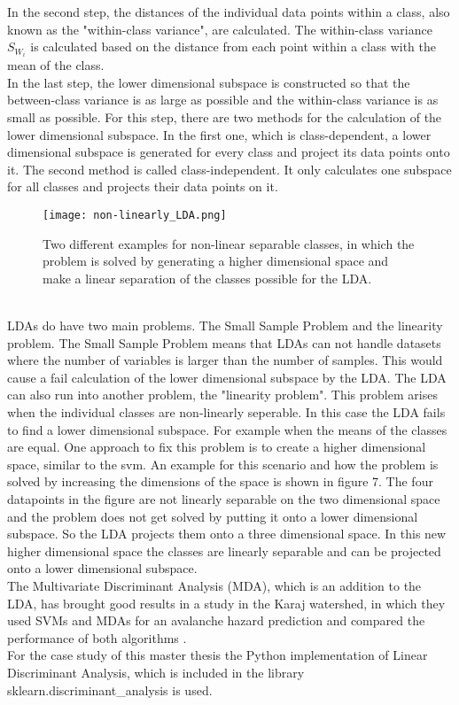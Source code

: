 \documentclass[../masterarbeit.tex]{subfiles}
\begin{document}
In the second step, the distances of the individual data points within a class, also known as the "within-class variance", are calculated. The within-class variance \(S_{W_i}\) is calculated based on the distance from each point within a class with the mean of the class. \autocite[]{Tharwat:2017} \\
In the last step, the lower dimensional subspace is constructed so that the between-class variance is as large as possible and the within-class variance is as small as possible. For this step, there are two methods for the calculation of the lower dimensional subspace. In the first one, which is class-dependent, a lower dimensional subspace is generated for every class and project its data points onto it. The second method is called class-independent. It only calculates one subspace for all classes and projects their data points on it. \autocite[]{Tharwat:2017}
\begin{figure}[h]
    \centering
    \texttt{[image: non-linearly\_LDA.png]}
    \caption{Two different examples for non-linear separable classes, in which the problem is solved by generating a higher dimensional space and make a linear separation of the classes possible for the LDA.}
\end{figure} \\
LDAs do have two main problems. The Small Sample Problem and the linearity problem.
The Small Sample Problem means that LDAs can not handle datasets where the number of variables is larger than the number of samples. This would cause a fail calculation of the lower dimensional subspace by the LDA. \autocite[]{MENDLEIN2013646} \autocite[]{analyticsvidhyaLDA:2021} \autocite[]{Tharwat:2017}
The LDA can also run into another problem, the "linearity problem". This problem arises when the individual classes are non-linearly seperable. In this case the LDA fails to find a lower dimensional subspace. For example when the means of the classes are equal. One approach to fix this problem is to create a higher dimensional space, similar to the svm. An example for this scenario and how the problem is solved by increasing the dimensions of the space is shown in figure 7. The four datapoints in the figure are not linearly separable on the two dimensional space and the problem does not get solved by putting it onto a lower dimensional subspace. So the LDA projects them onto a three dimensional space. In this new higher dimensional space the classes are linearly separable and can be projected onto a lower dimensional subspace. \autocite[]{Tharwat:2017} \\
The Multivariate Discriminant Analysis (MDA), which is an addition to the LDA, has brought good results in a study in the Karaj watershed, in which they used SVMs and MDAs for an avalanche hazard prediction and compared the performance of both algorithms \textcite[]{Bahram:2019}. \\
For the case study of this master thesis the Python implementation of Linear Discriminant Analysis, which is included in the library sklearn.discriminant\_analysis is used. \autocite[]{Scikit-learn-lda:2022}
\end{document}
